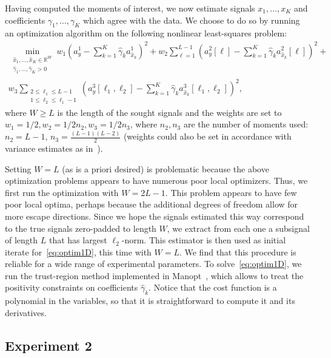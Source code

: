 \documentclass[12pt]{article}
\newcommand{\1}{\mathbf{1}}
\newcommand{\R}{\mathbb{R}}
\theoremstyle{plain}
\theoremstyle{definition}
\theoremstyle{remark}
\theoremstyle{plain}
\theoremstyle{remark}
\theoremstyle{plain}
\theoremstyle{plain}
\theoremstyle{plain}
\numberwithin{equation}{section}
\begin{document}
Having computed the moments of interest, we now estimate signals $x_1, \ldots, x_K$ and coefficients $\gamma_1, \ldots, \gamma_K$ which agree with the data. We choose to do so by running an optimization algorithm on the following nonlinear least-squares problem:
\begin{multline}
\min_{\substack{\hat x_1, \ldots, \hat x_K \in \R^{W} \\ \hat \gamma_1, \ldots, \hat \gamma_K > 0}} w_1 \left( a_y^1 - \sum_{k=1}^K \hat \gamma_k a_{\hat x_k}^1 \right)^2 + w_2 \sum_{\ell = 1}^{L-1} \left( a_y^2[\ell] - \sum_{k=1}^K \hat \gamma_k a_{\hat x_k}^2[\ell] \right)^2 + \\ w_3 \sum_{\substack{2\leq\ell_1\leq L-1 \\ 1 \leq \ell_2 \leq \ell_1-1}} \left( a_y^3[\ell_1, \ell_2] - \sum_{k=1}^K \hat \gamma_k a_{\hat x_k}^3[\ell_1,\ell_2] \right)^2,
\label{eq:optim1D}
\end{multline}
where $W \geq L$ is the length of the sought signals and the weights are set to $w_1 = 1/2, w_2 = 1/2n_2, w_3 = 1/2n_3$, where $n_2, n_3$ are the number of moments used: $n_2 = L-1$, $n_3 = \frac{(L-1)(L-2)}{2}$ (weights could also be set in accordance with variance estimates as in~\cite{boumal2017heterogeneous}).

Setting $W = L$ (as is a priori desired) is problematic because the above optimization problems appears to have numerous poor local optimizers.
Thus, we first run the optimization with $W = 2L-1$. This problem appears to have few poor local optima, perhaps because the additional degrees of freedom allow for more escape directions. Since we hope the signals estimated this way correspond to the true signals zero-padded to length $W$, we extract from each one a subsignal of length $L$ that has largest $\ell_2$-norm. This estimator is then used as initial iterate for~\eqref{eq:optim1D}, this time with $W = L$. We find that this procedure is reliable for a wide range of experimental parameters. To solve~\eqref{eq:optim1D}, we run the trust-region method implemented in Manopt~\cite{manopt}, which allows to treat the positivity constraints on coefficients $\hat \gamma_k$. Notice that the cost function is a polynomial in the variables, so that it is straightforward to compute it and its derivatives.


\subsection{Experiment 2}
\end{document}
